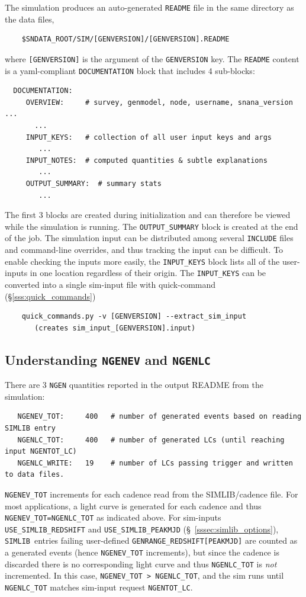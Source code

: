 \documentclass[12pt]{article}
\newcommand{\simlib}{{\tt SIMLIB}}
\begin{document}
The simulation produces an auto-generated {\tt README} file in the
same directory as the data files,
\begin{verbatim}
    $SNDATA_ROOT/SIM/[GENVERSION]/[GENVERSION].README
\end{verbatim} 
where {\tt [GENVERSION]} is the argument of the {\tt GENVERSION} key.
The {\tt README} content is a yaml-compliant {\tt DOCUMENTATION} block
that includes 4 sub-blocks:
\begin{verbatim} 
  DOCUMENTATION:
     OVERVIEW:     # survey, genmodel, node, username, snana_version ...
       ...
     INPUT_KEYS:   # collection of all user input keys and args
        ...
     INPUT_NOTES:  # computed quantities & subtle explanations
        ...
     OUTPUT_SUMMARY:  # summary stats
        ...
\end{verbatim} 
The first 3 blocks are created during initialization and can therefore
be viewed while the simulation is running. The {\tt OUTPUT\_SUMMARY} block
is created at the end of the job.
The simulation input can be distributed among several {\tt INCLUDE} files
and command-line overrides, and thus tracking the input can be difficult.
To enable checking the inputs more easily, the {\tt INPUT\_KEYS} block 
lists all of the user-inputs in one location regardless of their origin.
The {\tt INPUT\_KEYS} can be converted into a single sim-input file
with quick-command (\S\ref{sss:quick_commands})
\begin{verbatim}
    quick_commands.py -v [GENVERSION] --extract_sim_input 
       (creates sim_input_[GENVERSION].input)
\end{verbatim}


   \clearpage
   \subsection{Understanding {\tt NGENEV} and {\tt NGENLC} }
   \label{ssec:NGEN}

There are 3 {\tt NGEN} quantities reported in the output README
from the simulation:
\begin{verbatim}
   NGENEV_TOT:     400   # number of generated events based on reading SIMLIB entry
   NGENLC_TOT:     400   # number of generated LCs (until reaching input NGENTOT_LC)
   NGENLC_WRITE:   19    # number of LCs passing trigger and written to data files.
\end{verbatim}

{\tt NGENEV\_TOT} increments for each cadence read from the SIMLIB/cadence file.
For most applications, a light curve is generated for each cadence and thus
{\tt NGENEV\_TOT=NGENLC\_TOT} as indicated above. 
For sim-inputs {\tt USE\_SIMLIB\_REDSHIFT} and {\tt USE\_SIMLIB\_PEAKMJD} 
(\S~\ref{sssec:simlib_options}),
\simlib\ entries failing user-defined {\tt GENRANGE\_REDSHIFT[PEAKMJD]} are
counted as a generated events (hence {\tt NGENEV\_TOT} increments),
but since the cadence is discarded there is no corresponding light curve
and thus {\tt NGENLC\_TOT} is {\it not} incremented. In this case,
{\tt NGENEV\_TOT > NGENLC\_TOT}, and the sim runs until {\tt NGENLC\_TOT}
matches sim-input request {\tt NGENTOT\_LC}.
\end{document}
